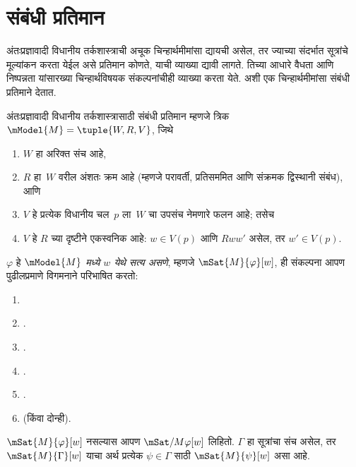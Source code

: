 \section{संबंधी प्रतिमान}\label{int:sem:rel:sec}
अंतःप्रज्ञावादी विधानीय तर्कशास्त्राची अचूक
चिन्हार्थमीमांसा द्यायची असेल, तर ज्याच्या
संदर्भात सूत्रांचे मूल्यांकन करता येईल
असे प्रतिमान कोणते, याची व्याख्या द्यावी लागते.
तिच्या आधारे वैधता आणि निष्पन्नता यांसारख्या
चिन्हार्थविषयक संकल्पनांचीही व्याख्या करता येते.
अशी एक चिन्हार्थमीमांसा संबंधी प्रतिमाने
देतात.
\begin{defn}
  अंतःप्रज्ञावादी विधानीय तर्कशास्त्रासाठी
  संबंधी प्रतिमान म्हणजे त्रिक
  $\mModel{M} = \tuple{W, R, V}$, जिथे
  \begin{enumerate}
  \item $W$ हा अरिक्त संच आहे,
  \item $R$ हा~$W$ वरील अंशतः क्रम आहे (म्हणजे
    परावर्ती, प्रतिसममित आणि संक्रमक द्विस्थानी संबंध), आणि
  \item $V$ हे प्रत्येक विधानीय चल~$p$ ला~$W$ चा उपसंच नेमणारे फलन आहे;
    तसेच
  \item $V$ हे $R$ च्या दृष्टीने एकस्वनिक आहे:
    $w \in V(p)$ आणि $Rww'$ असेल, तर
    $w' \in V(p)$.
  \end{enumerate}
\end{defn}
\begin{defn}\label{int:sem:rel:defn:true-at-w}
  $\varphi$ हे \emph{$\mModel{M}$ मध्ये $w$ येथे सत्य असणे},
  म्हणजे $\mSat{M}{\varphi}[w]$, ही संकल्पना आपण पुढीलप्रमाणे
  विगमनाने परिभाषित करतो:
  \begin{enumerate}
  \item {}
  \item {}.
  \item {}.
  \item {}.
  \item {}.
  \item {} (किंवा दोन्ही).
  \end{enumerate}
  $\mSat{M}{\varphi}[w]$ नसल्यास आपण
  $\mSat/{M}{\varphi}[w]$ लिहितो. $\Gamma$ हा
  सूत्रांचा संच असेल, तर $\mSat{M}{\Gamma}[w]$
  याचा अर्थ प्रत्येक $\psi \in \Gamma$ साठी
  $\mSat{M}{\psi}[w]$ असा आहे.
\end{defn}
